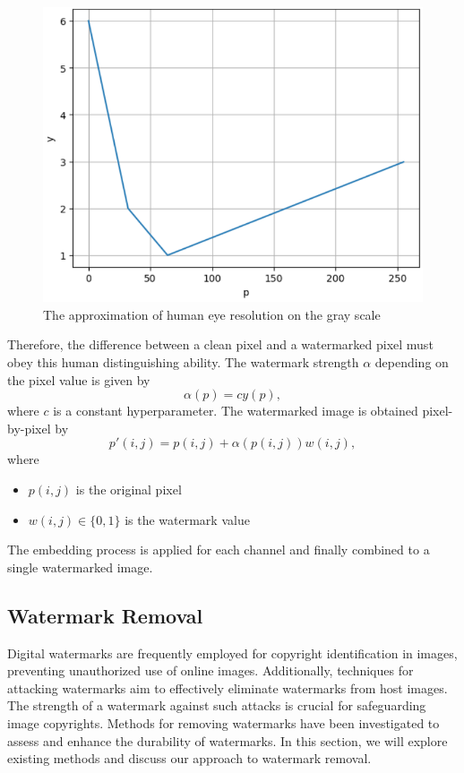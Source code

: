 \begin{figure}
    \centering
    \includegraphics[width=0.5\linewidth]{img/resolution.png}
    \vspace{0.5cm}
    \caption{The approximation of human eye resolution on the gray scale}
    \label{figure:human-eye-resolution}
\end{figure}

Therefore, the difference between a clean pixel and a watermarked pixel must obey this human distinguishing ability. The watermark strength $\alpha$ depending on the pixel value is given by
\begin{equation}
    \alpha(p)=cy(p),
\end{equation}
where $c$ is a constant hyperparameter. The watermarked image is obtained pixel-by-pixel by
\begin{equation}
    p'(i,j)=p(i,j)+\alpha
    (p(i,j))w(i,j),
\end{equation}
where
\begin{itemize}
    \item $p(i,j)$ is the original pixel
    \item $w(i,j)\in\{0,1\}$ is the watermark value
\end{itemize}

The embedding process is applied for each channel and finally combined to a single watermarked image.

\subsection{Watermark Removal}
Digital watermarks are frequently employed for copyright identification in images, preventing unauthorized use of online images. Additionally, techniques for attacking watermarks aim to effectively eliminate watermarks from host images. The strength of a watermark against such attacks is crucial for safeguarding image copyrights. Methods for removing watermarks have been investigated to assess and enhance the durability of watermarks. In this section, we will explore existing methods and discuss our approach to watermark removal.

